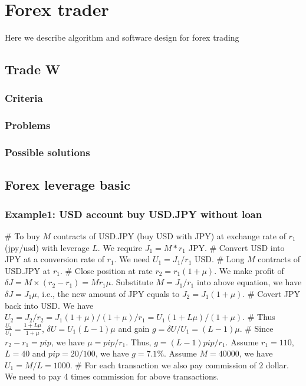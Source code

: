 \chapter{Forex trader}
Here we describe algorithm and software design for forex trading

\section{Trade W}
\subsection{Criteria}
\subsection{Problems}
\subsection{Possible solutions}


\section{Forex leverage basic}
\subsection*{Example1: USD account buy USD.JPY without loan}
\begin{listb}
# To buy $M$ contracts of USD.JPY (buy USD with JPY) at exchange rate of $r_1$ (jpy/usd) with leverage $L$. We require $J_1=M*r_1$ JPY.  
# Convert USD into JPY at a conversion rate of $r_1$. We need $U_1=J_1/r_1$ USD.
# Long $M$ contracts of USD.JPY at $r_1$.  
# Close position at rate $r_2 = r_1(1+\mu)$. We make profit of $\delta J = M\times (r_2-r_1)=Mr_1\mu$. Substitute  $M=J_1/r_1$ into above equation, we have $\delta J=J_1\mu$, i.e., the new amount of JPY equals to $J_2=J_1(1+\mu)$.
# Covert JPY back into USD. We have $U_2=J_2/r_2=J_1(1+\mu)/(1+\mu)/r_1 = U_1(1+L\mu)/(1+\mu)$. 
# Thus $\frac{U_2}{U_1}=\frac{1+L\mu}{1+\mu}$, $\delta U=U_1(L-1)\mu$ and gain $g=\delta U/U_1 = (L-1)\mu$. 
# Since $r_2-r_1 = pip$, we have $\mu=pip/r_1$. Thus, $g=(L-1)pip/r_1$. Assume $r_1=110$, $L=40$ and $pip=20/100$, we have $g=7.1\%$. Assume $M=40000$, we have $U_1=M/L=1000$.
# For each transaction we also pay commission of $2$ dollar. We need to pay 4 times commission for above transactions.

\end{listb}

